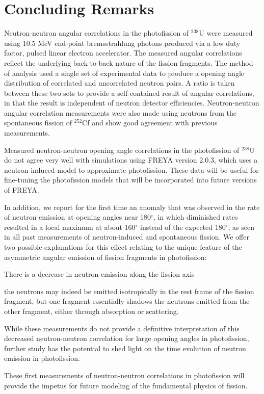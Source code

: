 \chapter{Concluding Remarks}
\thispagestyle{fancy}
Neutron-neutron angular correlations in the photofission of $^{238}$U were measured using 10.5 MeV end-point bremsstrahlung photons produced via a low duty factor, pulsed linear electron accelerator.
The measured angular correlations reflect the underlying back-to-back nature of the fission fragments.
The method of analysis used a single set of experimental data to produce a opening angle distribution of correlated and uncorrelated neutron pairs.
A ratio is taken between these two sets to provide a self-contained result of angular correlations, in that the result is independent of neutron detector efficiencies.
Neutron-neutron angular correlation measurements were also made using neutrons from the spontaneous fission of $^{252}$Cf and show good agreement with previous measurements.

Measured neutron-neutron opening angle correlations in the photofission of $^{238}$U do not agree very well with simulations using FREYA version 2.0.3, which uses a neutron-induced model to approximate photofission.
These data will be useful for fine-tuning the photofission models that will be incorporated into future versions of FREYA.

In addition, we report for the first time an anomaly that was observed in the rate of neutron emission at opening angles near 180$^{\circ}$, in which diminished rates resulted in a local maximum at about 160$^{\circ}$ instead of the expected 180$^{\circ}$, as seen in all past measurements of neutron-induced and spontaneous fission.
We offer two possible explanations for this effect relating to the unique feature of the asymmetric angular emission of fission fragments in photofission:
\begin{enumerate*}[label=(\roman*), itemjoin={{, }}, itemjoin*={{, or }}]
  \item There is a decrease in neutron emission along the fission axis
  \item the neutrons may indeed be emitted isotropically in the rest frame of the fission fragment, but one fragment essentially shadows the neutrons emitted from the other fragment, either through absorption or scattering.
  \end{enumerate*}
While these measurements do not provide a definitive interpretation of this decreased neutron-neutron correlation for large opening angles in photofission, further study has the potential to shed light on the time evolution of neutron emission in photofission.

These first measurements of neutron-neutron correlations in photofission will provide the impetus for future modeling of the fundamental physics of fission.
